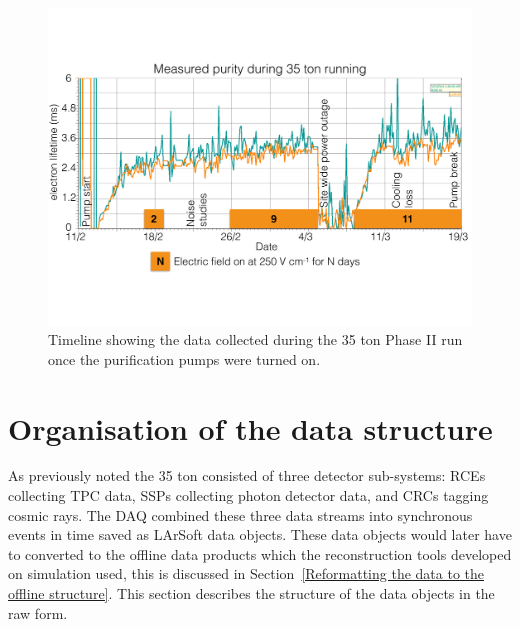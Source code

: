 \begin{figure}[h!]
  \centering
  \includegraphics[width=1.0\textwidth]{DataCollected}
  \caption[The 35 ton data sample]{Timeline showing the data collected during the 35 ton Phase II run once the purification pumps were turned on.}
  \label{fig:DataCollected}  
\end{figure}

\section{Organisation of the data structure} \label{Organisation of the data structure} %
As previously noted the 35 ton consisted of three detector sub-systems: RCEs collecting TPC data, SSPs collecting photon detector data, and CRCs tagging cosmic rays. The DAQ combined these three data streams into synchronous events in time saved as LArSoft data objects. These data objects would later have to converted to the offline data products which the reconstruction tools developed on simulation used, this is discussed in Section~\ref{Reformatting the data to the offline structure}. This section describes the structure of the data objects in the raw form.\\

